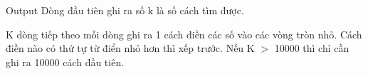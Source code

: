 Output
Dòng đầu tiên ghi ra số k là số cách tìm được.   


   K dòng tiếp theo mỗi dòng ghi ra 1 cách điền các số vào các vòng tròn nhỏ. Cách điền nào có thứ tự từ điển nhỏ hơn thì xếp trước. Nếu K $>$ 10000 thì chỉ cần ghi ra 10000 cách đầu tiên.